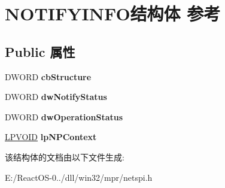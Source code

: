 \hypertarget{struct_n_o_t_i_f_y_i_n_f_o}{}\section{N\+O\+T\+I\+F\+Y\+I\+N\+F\+O结构体 参考}
\label{struct_n_o_t_i_f_y_i_n_f_o}
\subsection*{Public 属性}
\begin{DoxyCompactItemize}
\item 
\mbox{\label{struct_n_o_t_i_f_y_i_n_f_o_ae0aaaf1c92716bcab63da1a95004cafb}} 
D\+W\+O\+RD {\bfseries cb\+Structure}
\item 
\mbox{\label{struct_n_o_t_i_f_y_i_n_f_o_aa46d1f57084a91f0a887bf5b5e36dd7f}} 
D\+W\+O\+RD {\bfseries dw\+Notify\+Status}
\item 
\mbox{\label{struct_n_o_t_i_f_y_i_n_f_o_a7ec34f92d8b16598ce9f11ea2b3fdfef}} 
D\+W\+O\+RD {\bfseries dw\+Operation\+Status}
\item 
\mbox{\label{struct_n_o_t_i_f_y_i_n_f_o_a12c9e710665a388bd162b827aa6c70ee}} 
\hyperlink{interfacevoid}{L\+P\+V\+O\+ID} {\bfseries lp\+N\+P\+Context}
\end{DoxyCompactItemize}


该结构体的文档由以下文件生成\+:\begin{DoxyCompactItemize}
\item 
E\+:/\+React\+O\+S-\/0../dll/win32/mpr/netspi.\+h\end{DoxyCompactItemize}
